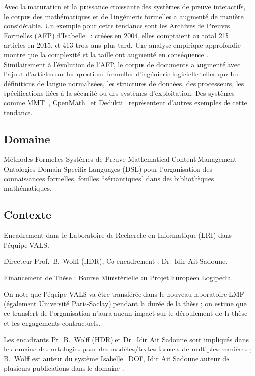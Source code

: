 \documentclass[a4paper,10pt]{article}
\begin{document}
Avec la maturation et la puissance croissante
des systèmes de preuve interactifs,
le corpus des mathématiques et de l'ingénierie formelles a augmenté
de manière considérable.
Un exemple pour cette tendance sont
les Archives de Preuves Formelles (AFP) d'Isabelle~\cite{afp} :
créées en 2004, elles comptaient au total 215 articles en 2015,
et 413 trois ans plus tard.
Une analyse empirique approfondie montre que
la complexité et la taille ont augmenté en conséquence
\cite{DBLP:conf/mkm/BlanchetteHMN15}.
Similairement à l'évolution de l'AFP,
le corpus de documents a augmenté avec l'ajout d'articles
sur les questions formelles d'ingénierie logicielle
telles que les définitions de langue normalisées,
les structures de données, des processeurs,
les spécifications liées à la sécurité  ou des systèmes d'exploitation.
Des systèmes comme MMT~\cite{mmt}, OpenMath~\cite{openmath}
et Dedukti~\cite{dedukti} représentent
d'autres exemples de cette tendance.

\subsection*{Domaine}

Méthodes Formelles \textemdash{}
Systèmes de Preuve \textemdash{}
Mathematical Content Management \textemdash{}
Ontologies \textemdash{}
Domain-Specific Languages (DSL)
pour l'organisation des connaissances formelles,
fouilles \enquote{sémantiques} dans des bibliothèques mathématiques.

\subsection*{Contexte}

Encadrement dans le Laboratoire de Recherche en Informatique (LRI)
dans l'équipe VALS\@.

Directeur Prof.\ B.\ Wolff (HDR), Co-encadrement : Dr.\ Idir Ait Sadoune.

Financement de Thèse : Bourse Ministérielle ou Projet Européen Logipedia.

On note que l'équipe VALS va être transférée
dans le nouveau laboratoire LMF (également Université Paris-Saclay)
pendant la durée de la thèse ;
on estime que ce transfert de l'organisation n'aura aucun impact
sur le déroulement de la thèse et les engagements contractuels.

Les encadrants Pr.\ B.\ Wolff (HDR) et Dr.\ Idir Ait Sadoune sont impliqués
dans le domaine des ontologies pour des modèles/textes formels
de multiples manières ;
B.\ Wolff est auteur du système Isabelle\_DOF,
Idir Ait Sadoune auteur de plusieurs publications dans le domaine
\cite{DBLP:conf/medi/Ait-SadouneM19}.
\end{document}

